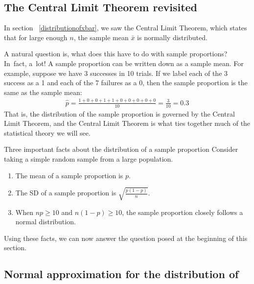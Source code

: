 \subsection{The Central Limit Theorem revisited}

In section ~\ref{distributionofxbar}, we saw the Central Limit Theorem, which states that for large enough $n$, the sample mean $\bar{x}$ is normally distributed.

A natural question is, what does this have to do with sample proportions? In~fact, a~lot! A sample proportion can be written down as a sample mean. For example, suppose we have 3 successes in 10 trials. If we label each of the 3 success as a 1 and each of the 7 failures as a 0, then the sample proportion is the same as the sample mean:
\begin{align*}
\hat{p}
	= \frac{1 + 0 + 0 + 1 + 1 + 0 + 0 + 0 + 0 + 0}{10}
	= \frac{3}{10}
	= 0.3
\end{align*}
That is, the distribution of the sample proportion is governed by the Central Limit Theorem, and the Central Limit Theorem is what ties together much of the statistical theory we will see.


\begin{onebox}{Three important facts about the distribution of a sample proportion }
Consider taking a simple  random sample from a large population.
\begin{enumerate}
\setlength{\itemsep}{0mm}
\item The mean of a sample proportion is $p$.
\item The SD of a sample proportion is $\sqrt{\frac{p(1-p)}{n}}$.
\item When $np \geq 10$ and $n(1-p) \geq 10$, the sample proportion closely follows a normal distribution. 
\end{enumerate}\end{onebox}

Using these facts, we can now answer the question posed at the beginning of this section.



\subsection[Normal approximation for the distribution of $\hat{p}$]{Normal approximation for the distribution of }

